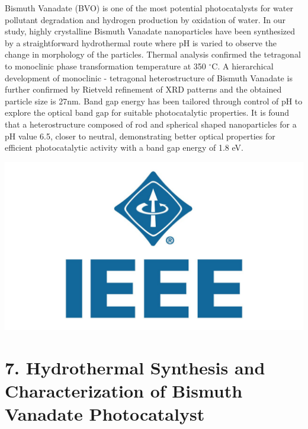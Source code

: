 \documentclass[a4paper,20pt]{article}
\begin{document}
    \begin{minipage}{.69\linewidth} \begin{flushleft}
    
    		 Bismuth Vanadate (BVO) is one of the most potential photocatalysts for water pollutant degradation and hydrogen production by oxidation of water. In our study, highly crystalline Bismuth Vanadate nanoparticles have been synthesized by a straightforward hydrothermal route where pH is varied to observe the change in morphology of the particles. Thermal analysis confirmed the tetragonal to monoclinic phase transformation temperature at 350 $^{\circ}$C. A hierarchical development of monoclinic - tetragonal heterostructure of Bismuth Vanadate is further confirmed by Rietveld refinement of XRD patterns and the obtained particle size is 27nm. Band gap energy has been tailored through control of pH to explore the optical band gap for suitable photocatalytic properties. It is found that a heterostructure composed of rod and spherical shaped nanoparticles for a pH value 6.5, closer to neutral, demonstrating better optical properties for efficient photocatalytic activity with a band gap energy of 1.8 eV.
    	\end{flushleft} \end{minipage}
    	 \hfill 
    \begin{minipage}{0.29\linewidth}\begin{flushright}
    	 	\includegraphics[width=1.0\linewidth]{ieee}\\
    	\end{flushright}\end{minipage}
    	
\vspace{8pt}


\section{\textbf{7. Hydrothermal Synthesis and Characterization of Bismuth Vanadate Photocatalyst}}
\end{document}
